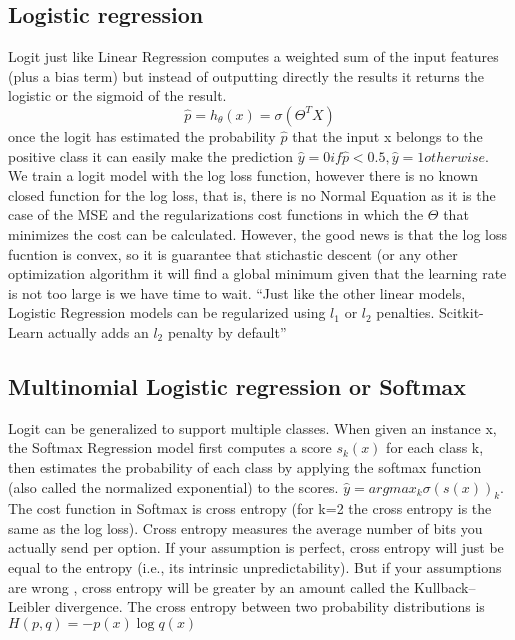 \documentclass[11pt]{article}
\begin{document}
\subsection{Logistic regression}
Logit just like Linear Regression computes a weighted sum of the input features (plus a bias term) but instead of outputting directly the results it returns the logistic or the sigmoid of the result.
\begin{equation}
\hat{p} = h_{\theta}(x) = \sigma(\Theta^{T} X)
\end{equation}
once the logit has estimated the probability $\hat{p}$ that the input x belongs to the positive class it can easily make the prediction $\hat{y} = 0 if \hat{p} < 0.5, \hat{y} = 1 otherwise$. We train a logit model with the log loss function, however there is no known closed function for the log loss, that is, there is no Normal Equation as it is the case of the MSE and the regularizations cost functions in which the $\Theta$ that minimizes the cost can be calculated. However, the good news is that the log loss fucntion is convex, so it is guarantee that stichastic descent (or any other optimization algorithm it will find a global minimum given that the learning rate is not too large is we have time to wait.
“Just like the other linear models, Logistic Regression models can be regularized using $l_1$ or $l_2$ penalties. Scitkit-Learn actually adds an $l_2$ penalty by default”


\subsection{Multinomial Logistic regression or Softmax}

Logit can be generalized to support multiple classes. When given an instance x, the Softmax Regression model first computes a score $s_{k}(x)$ for each class k, then estimates the probability of each class by applying the softmax function (also called the normalized exponential) to the scores. $\hat{y}= argmax_{k} \sigma(s(x))_k$. The cost function in Softmax is cross entropy (for k=2 the cross entropy is the same as the log loss). Cross entropy measures the average number of bits you actually send per option. If your assumption is perfect, cross entropy will just be equal to the entropy (i.e., its intrinsic unpredictability). But if your assumptions are wrong , cross entropy will be greater by an amount called the Kullback–Leibler divergence. The cross entropy between two probability distributions is $ H(p,q)= -p(x)\log q(x)$
\end{document}
